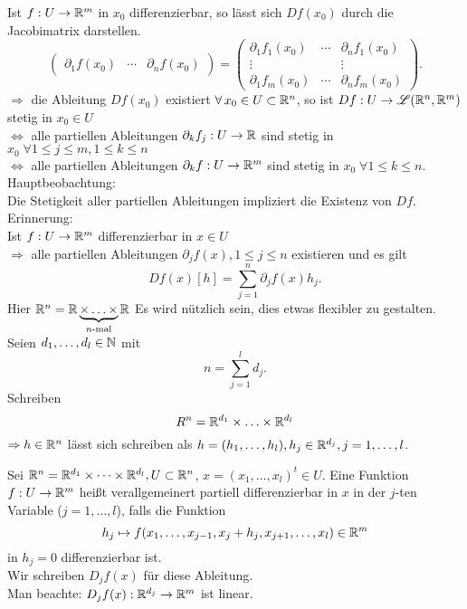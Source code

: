 \documentclass[../ana2.tex]{subfiles}
\begin{document}
Ist \(f:U\rightarrow \mathbb{R}^m \) in \(x_0\) differenzierbar, so lässt 
sich \(Df(x_0)\) durch die Jacobimatrix darstellen.
\[ \begin{pmatrix}
    \partial_1 f(x_0) & \cdots & \partial_n f(x_0)
\end{pmatrix} = \begin{pmatrix}
    \partial_1 f_1(x_0) & \cdots & \partial_n f_1(x_0) \\
    \vdots && \vdots \\
    \partial_1 f_m(x_0) & \cdots & \partial_n f_m(x_0)
\end{pmatrix}. \]
\( \Rightarrow \) die Ableitung \( Df(x_0) \) existiert 
\( \forall x_0 \in U \subset \R^n \), so ist 
\( Df:U\rightarrow \mathscr{L}(\mathbb{R}^n, \mathbb{R}^m) \) 
stetig in \( x_0 \in U \) \\
\( \Leftrightarrow \) alle partiellen Ableitungen 
\( \partial_k f_j:U\rightarrow \mathbb{R} \) sind stetig in 
\(x_0 \; \forall 1 \leq j \leq m, 1 \leq k \leq n \) \\
\( \Leftrightarrow \) alle partiellen Ableitungen 
\( \partial_k f:U\rightarrow \mathbb{R}^m \)
sind stetig in \(x_0 \; \forall 1 \leq k \leq n\).
Hauptbeobachtung:\\
Die Stetigkeit aller partiellen Ableitungen 
impliziert die Existenz von \(Df\).\\
Erinnerung: \\
Ist \(f:U\rightarrow \mathbb{R}^m\)
differenzierbar in \( x\in U \)\\
\( \Rightarrow \) alle partiellen Ableitungen 
\( \partial_j f(x), 1 \leq j \leq n \) existieren
und es gilt
\[ Df(x)[h] = \sum_{j=1}^n \partial_j f(x) h_j. \]
Hier \( \mathbb{R}^n = \mathbb{R} \underbrace{\times \ldots \times}_{n\text{-mal}} \mathbb{R} \)
Es wird nützlich sein, dies etwas flexibler zu 
gestalten.\\
Seien \( d_1, \ldots, d_l \in \mathbb{N} \) mit
\[ n = \sum_{j=1}^l d_j. \]
Schreiben 
\[ R^n = \mathbb{R}^{d_1} \times \ldots \times \mathbb{R}^{d_l} \]
\( \Rightarrow h \in \mathbb{R}^n \) lässt sich schreiben
als \( h = (h_1,\ldots, h_l), h_j \in \mathbb{R}^{d_j}, j=1,\ldots,l \).
\begin{defi}
    Sei \( \mathbb{R}^n = \mathbb{R}^{d_1} \times \dots \times \mathbb{R}^{d_l}, U \subset \mathbb{R}^n \),
    \( x = (x_1, \ldots, x_l)^t \in U \).
    Eine Funktion \( f:U\rightarrow \mathbb{R}^m \) heißt verallgemeinert
    partiell differenzierbar in \(x\) in der \(j\)-ten 
    Variable (\(j = 1, \ldots, l\)), falls die Funktion 
    \[ h_j \mapsto f(x_1,\ldots, x_{j-1}, x_j + h_j, 
    x_{j+1}, \ldots, x_l) \in \mathbb{R}^m \] 
    in \( h_j = 0 \) differenzierbar ist.\\
    Wir schreiben \(D_jf(x)\) für diese Ableitung.\\
    Man beachte: \( D_jf(x):\mathbb{R}^{d_j}\rightarrow \mathbb{R}^m \) ist linear.
\end{defi}
\end{document}
